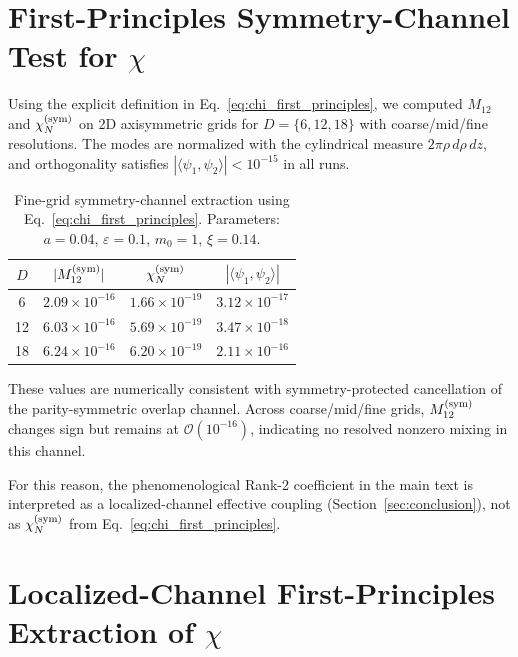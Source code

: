 \documentclass[aps,prd,onecolumn,notitlepage,nofootinbib,superscriptaddress,11pt,floatfix]{revtex4-2}
\newcommand{\Order}{\mathcal{O}}
\begin{document}
\section{First-Principles Symmetry-Channel Test for \texorpdfstring{$\chi$}{chi}}
\label{app:chi_sym}

Using the explicit definition in Eq.~\eqref{eq:chi_first_principles}, we computed $M_{12}$ and $\chi_N^{\rm(sym)}$ on 2D axisymmetric grids for $D=\{6,12,18\}$ with coarse/mid/fine resolutions. The modes are normalized with the cylindrical measure $2\pi\rho\,d\rho\,dz$, and orthogonality satisfies $|\langle\psi_1,\psi_2\rangle|<10^{-15}$ in all runs.

\begin{table}[htbp]
\centering
\caption{Fine-grid symmetry-channel extraction using Eq.~\eqref{eq:chi_first_principles}. Parameters: $a=0.04$, $\varepsilon=0.1$, $m_0=1$, $\xi=0.14$.}
\label{tab:chi_sym}
\begin{tabular}{cccc}
\hline\hline
$D$ & $|M_{12}^{\rm(sym)}|$ & $\chi_N^{\rm(sym)}$ & $|\langle\psi_1,\psi_2\rangle|$ \\
\hline
6  & $2.09\times 10^{-16}$ & $1.66\times 10^{-19}$ & $3.12\times 10^{-17}$ \\
12 & $6.03\times 10^{-16}$ & $5.69\times 10^{-19}$ & $3.47\times 10^{-18}$ \\
18 & $6.24\times 10^{-16}$ & $6.20\times 10^{-19}$ & $2.11\times 10^{-16}$ \\
\hline\hline
\end{tabular}
\end{table}

These values are numerically consistent with symmetry-protected cancellation of the parity-symmetric overlap channel. Across coarse/mid/fine grids, $M_{12}^{\rm(sym)}$ changes sign but remains at $\Order(10^{-16})$, indicating no resolved nonzero mixing in this channel.

For this reason, the phenomenological Rank-2 coefficient in the main text is interpreted as a localized-channel effective coupling (Section~\ref{sec:conclusion}), not as $\chi_N^{\rm(sym)}$ from Eq.~\eqref{eq:chi_first_principles}.



\section{Localized-Channel First-Principles Extraction of \texorpdfstring{$\chi$}{chi}}
\label{app:chi_loc}
\end{document}
